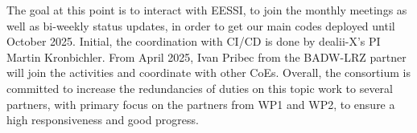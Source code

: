 \documentclass[a4paper,12pt]{article}
\begin{document}
The goal at this point is to interact with EESSI, to join the monthly meetings
as well as bi-weekly status updates, in order to get our main codes deployed
until October 2025. Initial, the coordination with CI/CD is done by dealii-X's
PI Martin Kronbichler. From April 2025, Ivan Pribec from the BADW-LRZ partner
will join the activities and coordinate with other CoEs. Overall, the
consortium is committed to increase the redundancies of duties on this topic
work to several partners, with primary focus on the partners from WP1 and WP2,
to ensure a high responsiveness and good progress.

\label{MyLastPage}
\end{document}
